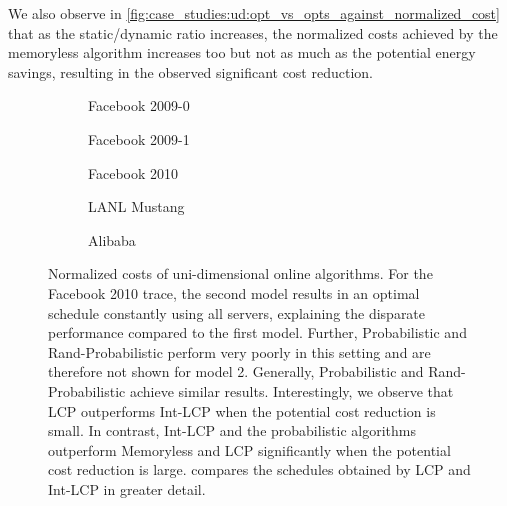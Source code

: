 We also observe in \cref{fig:case_studies:ud:opt_vs_opts_against_normalized_cost} that as the static/dynamic ratio increases, the normalized costs achieved by the memoryless algorithm increases too but not as much as the potential energy savings, resulting in the observed significant cost reduction.

\begin{figure}
    \begin{subfigure}[b]{.3425\linewidth}
    \resizebox{\textwidth}{!}{}
    \caption{Facebook 2009-0}
    \end{subfigure}
    \begin{subfigure}[b]{.32\linewidth}
    \resizebox{\textwidth}{!}{}
    \caption{Facebook 2009-1}
    \end{subfigure}
    \begin{subfigure}[b]{.32\linewidth}
    \resizebox{\textwidth}{!}{}
    \caption{Facebook 2010}
    \end{subfigure}
    \par\bigskip
    \begin{subfigure}[b]{.50\linewidth}
    \resizebox{\textwidth}{!}{}
    \caption{LANL Mustang}
    \end{subfigure}
    \begin{subfigure}[b]{.48\linewidth}
    \resizebox{\textwidth}{!}{}
    \caption{Alibaba}
    \end{subfigure}
    \caption{Normalized costs of uni-dimensional online algorithms. For the Facebook 2010 trace, the second model results in an optimal schedule constantly using all servers, explaining the disparate performance compared to the first model. Further, Probabilistic and Rand-Probabilistic perform very poorly in this setting and are therefore not shown for model 2. Generally, Probabilistic and Rand-Probabilistic achieve similar results. Interestingly, we observe that LCP outperforms Int-LCP when the potential cost reduction is small. In contrast, Int-LCP and the probabilistic algorithms outperform Memoryless and LCP significantly when the potential cost reduction is large.  compares the schedules obtained by LCP and Int-LCP in greater detail.}\label{fig:case_studies:ud:normalized_cost}
\end{figure}

